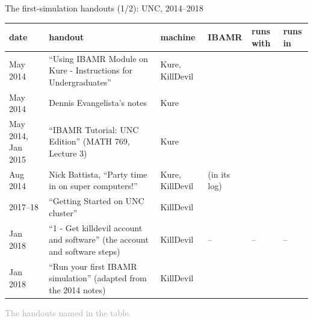 \documentclass[aspectratio=169,11pt]{beamer}
\newcommand{\sourcecredit}[1]{\vfill\begin{flushright}\tiny\textcolor{DarkGray}{#1}\end{flushright}}
\begin{document}
\begin{frame}{The first-simulation handouts (1/2): UNC, 2014--2018}
\label{fr:handouts}
\scriptsize
\renewcommand{\arraystretch}{1.12}
\setlength{\tabcolsep}{3pt}
\begin{tabular}{@{}L{0.09\textwidth}L{0.27\textwidth}L{0.13\textwidth}L{0.13\textwidth}L{0.13\textwidth}L{0.17\textwidth}@{}}
\toprule
date & handout & machine & IBAMR & runs with & runs in \\
\midrule
May 2014 & ``Using IBAMR Module on Kure - Instructions for Undergraduates'' & Kure, KillDevil &  &  &  \\
May 2014 & Dennis Evangelista's notes & Kure &  &  &  \\
May 2014, Jan 2015 & ``IBAMR Tutorial: UNC Edition'' (MATH 769, Lecture 3) & Kure &  &  &  \\
Aug 2014 & Nick Battista, ``Party time in on super computers!'' & Kure, KillDevil &  (in its log) &  &  \\
2017--18 & ``Getting Started on UNC cluster'' & KillDevil &  &  &  \\
Jan 2018 & ``1 - Get killdevil account and software'' (the account and software steps) & KillDevil & -- & -- & -- \\
Jan 2018 & ``Run your first IBAMR simulation'' (adapted from the 2014 notes) & KillDevil &  &  &  \\
\bottomrule
\end{tabular}
\sourcecredit{The handouts named in the table.}
\end{frame}
\end{document}
